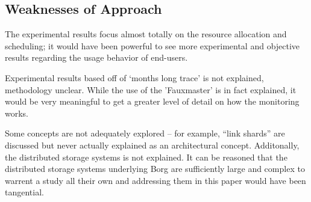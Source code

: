 \documentclass[runningheads,a4paper]{llncs}
\begin{document}
\subsection{Weaknesses of Approach}
The experimental results focus almost totally on the resource allocation and scheduling; it would have been powerful to see more experimental and objective results regarding the usage behavior of end-users.

Experimental results based off of ‘months long trace’ is not explained, methodology unclear.  While the use of the 'Fauxmaster' is in fact explained, it would be very meaningful to get a greater level of detail on how the monitoring works.

Some concepts are not adequately explored -- for example, “link shards” are discussed but never actually explained as an architectural concept.  Additonally, the distributed storage systems is not explained.  It can be reasoned that the distributed storage systems underlying Borg are sufficiently large and complex to warrent a study all their own and addressing them in this paper would have been tangential.  




\end{document}

